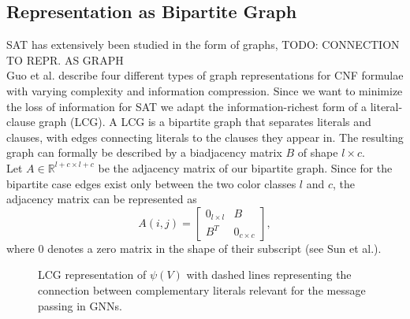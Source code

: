 \subsection{Representation as Bipartite Graph}
SAT has extensively been studied in the form of graphs, TODO: CONNECTION TO REPR. AS GRAPH\\
Guo et al.\cite{guo2023machine} describe four different types of graph representations for CNF formulae with varying complexity and information compression. Since we want to minimize the loss of information for SAT we adapt the information-richest form of a literal-clause graph (LCG). 
A LCG is a bipartite graph that separates literals and clauses, with edges connecting literals to the clauses they appear in.
The resulting graph can formally be described by a biadjacency matrix $B$ of shape $l \times c$. \\
Let $A \in \mathbb{R}^{l+c \times l+c}$ be the adjacency matrix of our bipartite graph. Since for the bipartite case edges exist only between the two color classes $l$ and $c$, the adjacency matrix can be represented as
\begin{equation}
    A(i,j) = \begin{bmatrix}
        0_{l \times l} & B \\
        B^T & 0_{c \times c}
    \end{bmatrix},
\end{equation}
where $0$ denotes a zero matrix in the shape of their subscript (see Sun et al.\cite{articleBiadjacency}). \bigskip

\begin{figure}[h]
    \centering
    \caption{LCG representation of $\psi(V)$ with dashed lines representing the connection between complementary literals relevant for the message passing in GNNs.}
    \label{fig:lcg-sat}
\end{figure}

